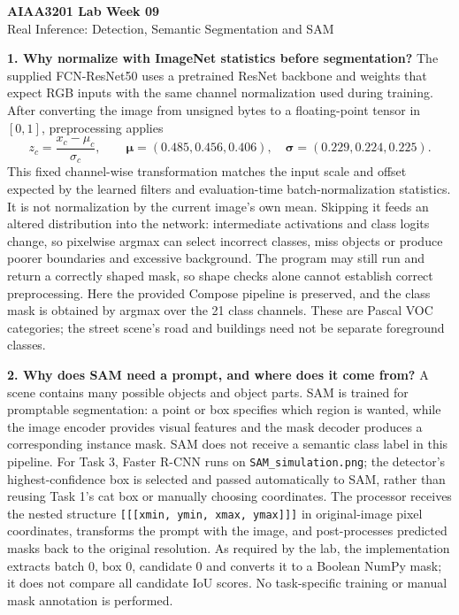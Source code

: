 \documentclass[10pt,a4paper]{article}
\begin{document}
\begin{center}
{\Large\bfseries\color{ink} AIAA3201 Lab Week 09}\\[3pt]
{\normalsize Real Inference: Detection, Semantic Segmentation and SAM}
\end{center}

\textbf{1. Why normalize with ImageNet statistics before segmentation?}
The supplied FCN-ResNet50 uses a pretrained ResNet backbone and weights that
expect RGB inputs with the same channel normalization used during training.
After converting the image from unsigned bytes to a floating-point tensor in
$[0,1]$, preprocessing applies
\[
z_c=\frac{x_c-\mu_c}{\sigma_c},\qquad
\boldsymbol\mu=(0.485,0.456,0.406),\quad
\boldsymbol\sigma=(0.229,0.224,0.225).
\]
This fixed channel-wise transformation matches the input scale and offset
expected by the learned filters and evaluation-time batch-normalization
statistics. It is not normalization by the current image's own mean.
Skipping it feeds an altered distribution into the network: intermediate
activations and class logits change, so pixelwise argmax can select incorrect
classes, miss objects or produce poorer boundaries and excessive background.
The program may still run and return a correctly shaped mask, so shape checks
alone cannot establish correct preprocessing. Here the provided Compose
pipeline is preserved, and the class mask is obtained by argmax over the
21 class channels. These are Pascal VOC categories; the street scene's
road and buildings need not be separate foreground classes.

\textbf{2. Why does SAM need a prompt, and where does it come from?}
A scene contains many possible objects and object parts. SAM is trained for
promptable segmentation: a point or box specifies which region is wanted,
while the image encoder provides visual features and the mask decoder
produces a corresponding instance mask. SAM does not receive a semantic
class label in this pipeline. For Task 3, Faster R-CNN runs on
\texttt{SAM\_simulation.png}; the detector's highest-confidence box is selected
and passed automatically to SAM, rather than reusing Task 1's cat box or
manually choosing coordinates. The processor receives the nested structure
\texttt{[[[xmin, ymin, xmax, ymax]]]} in original-image pixel coordinates,
transforms the prompt with the image, and post-processes predicted masks back
to the original resolution. As required by the lab, the implementation
extracts batch 0, box 0, candidate 0 and converts it to a Boolean NumPy mask;
it does not compare all candidate IoU scores. No task-specific training or
manual mask annotation is performed.
\end{document}

